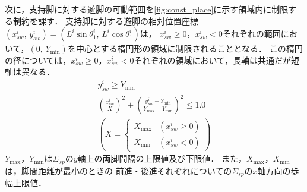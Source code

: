 \documentclass[autodetect-engine,dvipdfmx-if-dvi,ja=standard,a4j,jbase=11pt,magstyle=nomag*]{bxjsreport}
\begin{document}
次に，支持脚に対する遊脚の可動範囲を\cref{fig:const_place}に示す領域内に制限する制約を課す．
支持脚に対する遊脚の相対位置座標$( x_{sw}^i ,\, y_{sw}^i ) = ( L^i \sin \theta_1^i ,\, L^i \cos \theta_1^i )$は，
$x_{sw}^i \geq 0$，$x_{sw}^i < 0$それぞれの範囲において，$( 0 ,\, Y_{\mathrm{min}} )$を中心とする楕円形の領域に制限されることとなる．
この楕円の径については，$x_{sw}^i \geq 0$，$x_{sw}^i < 0$それぞれの領域において，長軸は共通だが短軸は異なる．
\begin{equation}
\label{eq:const_place}
    \begin{gathered}
        y_{sw}^i \geq Y_{\mathrm{min}} \\ 
        \left( \frac{x_{sw}^i}{X} \right)^2 + \left( \frac{y_{sw}^i - Y_{\mathrm{min}}}{Y_{\mathrm{max}} - Y_{\mathrm{min}}} \right)^2 \leq 1.0 \\
        \left( X = 
        \begin{cases}
            X_{\mathrm{max}} & \left( x_{sw}^i \geq 0 \right) \\
            X_{\mathrm{min}} & \left( x_{sw}^i < 0 \right)
        \end{cases}
        \right)
    \end{gathered}
\end{equation}
$Y_{\mathrm{max}}$，$Y_{\mathrm{min}}$は$\Sigma_{sp}$の$y$軸上の両脚間隔の上限値及び下限値．
また，$X_{\mathrm{max}}$，$X_{\mathrm{min}}$は，脚間距離が最小のときの
前進・後進それぞれについての$\Sigma_{sp}$の$x$軸方向の歩幅上限値．
\end{document}
